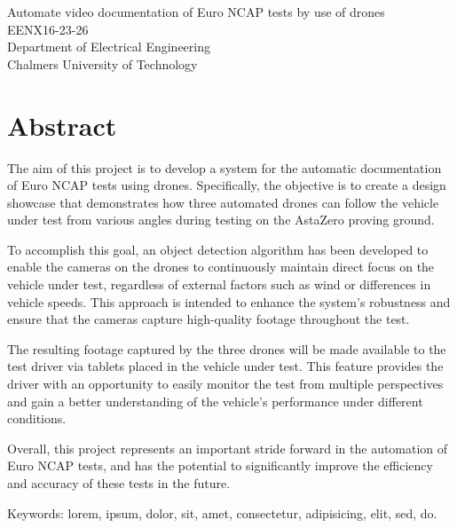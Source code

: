 Automate video documentation of Euro NCAP tests by use of drones\\
EENX16-23-26\\
Department of Electrical Engineering\\
Chalmers University of Technology \setlength{\parskip}{0.5cm}

\thispagestyle{plain}			%
\setlength{\parskip}{0pt plus 1.0pt}
\section*{Abstract}
The aim of this project is to develop a system for the automatic documentation of Euro NCAP tests using drones. Specifically, the objective is to create a design showcase that demonstrates how three automated drones can follow the vehicle under test from various angles during testing on the AstaZero proving ground.

To accomplish this goal, an object detection algorithm has been developed to enable the cameras on the drones to continuously maintain direct focus on the vehicle under test, regardless of external factors such as wind or differences in vehicle speeds. This approach is intended to enhance the system's robustness and ensure that the cameras capture high-quality footage throughout the test.

The resulting footage captured by the three drones will be made available to the test driver via tablets placed in the vehicle under test. This feature provides the driver with an opportunity to easily monitor the test from multiple perspectives and gain a better understanding of the vehicle's performance under different conditions.

Overall, this project represents an important stride forward in the automation of Euro NCAP tests, and has the potential to significantly improve the efficiency and accuracy of these tests in the future.

\vfill
Keywords: lorem, ipsum, dolor, sit, amet, consectetur, adipisicing, elit, sed, do.

\newpage				%
\thispagestyle{empty}
\mbox{}